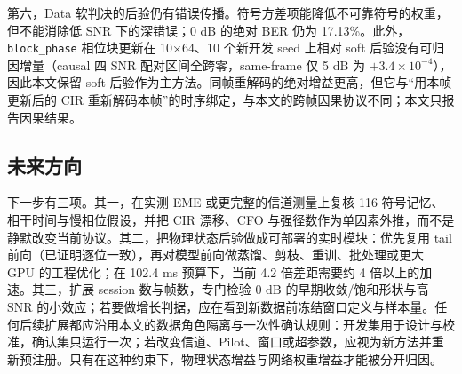 第六，Data 软判决的后验仍有错误传播。符号方差项能降低不可靠符号的权重，但不能消除低 SNR 下的深错误；0 dB 的绝对 BER 仍为 17.13\%。此外，\texttt{block\_phase} 相位块更新在 10×64、10 个新开发 seed 上相对 soft 后验没有可归因增量（causal 四 SNR 配对区间全跨零，same-frame 仅 5 dB 为 $+3.4\times10^{-4}$），因此本文保留 soft 后验作为主方法。同帧重解码的绝对增益更高，但它与“用本帧更新后的 CIR 重新解码本帧”的时序绑定，与本文的跨帧因果协议不同；本文只报告因果结果。

\subsection{未来方向}

下一步有三项。其一，在实测 EME 或更完整的信道测量上复核 116 符号记忆、相干时间与慢相位假设，并把 CIR 漂移、CFO 与强径数作为单因素外推，而不是静默改变当前协议。其二，把物理状态后验做成可部署的实时模块：优先复用 tail 前向（已证明逐位一致），再对模型前向做蒸馏、剪枝、重训、批处理或更大 GPU 的工程优化；在 102.4 ms 预算下，当前 4.2 倍差距需要约 4 倍以上的加速。其三，扩展 session 数与帧数，专门检验 0 dB 的早期收敛/饱和形状与高 SNR 的小效应；若要做增长判据，应在看到新数据前冻结窗口定义与样本量。任何后续扩展都应沿用本文的数据角色隔离与一次性确认规则：开发集用于设计与校准，确认集只运行一次；若改变信道、Pilot、窗口或超参数，应视为新方法并重新预注册。只有在这种约束下，物理状态增益与网络权重增益才能被分开归因。
